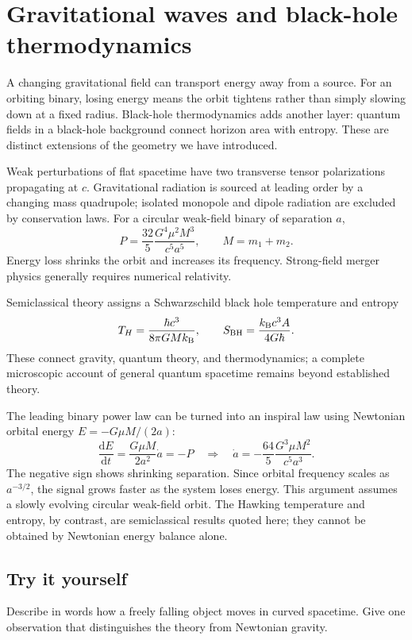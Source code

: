 \documentclass[11pt,oneside]{book}
\newcommand{\dd}{\mathrm{d}}
\newcommand{\od}[2]{\frac{\dd #1}{\dd #2}}
\newcommand{\kb}{k_{\mathrm B}}
\theoremstyle{reviewstyle}
\newcommand{\learningcheck}[1]{\subsection*{Try it yourself}\noindent #1\par}
\begin{document}
\section{Gravitational waves and black-hole thermodynamics}
A changing gravitational field can transport energy away from a source. For an orbiting binary, losing energy means the orbit tightens rather than simply slowing down at a fixed radius. Black-hole thermodynamics adds another layer: quantum fields in a black-hole background connect horizon area with entropy. These are distinct extensions of the geometry we have introduced.

Weak perturbations of flat spacetime have two transverse tensor polarizations propagating at $c$. Gravitational radiation is sourced at leading order by a changing mass quadrupole; isolated monopole and dipole radiation are excluded by conservation laws. For a circular weak-field binary of separation $a$,
\begin{equation}P=\frac{32}{5}\frac{G^4\mu^2M^3}{c^5a^5},\qquad M=m_1+m_2.\end{equation}
Energy loss shrinks the orbit and increases its frequency. Strong-field merger physics generally requires numerical relativity.

Semiclassical theory assigns a Schwarzschild black hole temperature and entropy
\begin{equation}T_H=\frac{\hbar c^3}{8\pi G M\kb},\qquad S_{\rm BH}=\frac{\kb c^3A}{4G\hbar}.\end{equation}
These connect gravity, quantum theory, and thermodynamics; a complete microscopic account of general quantum spacetime remains beyond established theory.

The leading binary power law can be turned into an inspiral law using Newtonian orbital energy $E=-G\mu M/(2a)$:
\begin{equation}
\od Et=\frac{G\mu M}{2a^2}\dot a=-P
\quad\Longrightarrow\quad
\dot a=-\frac{64}{5}\frac{G^3\mu M^2}{c^5a^3}.
\end{equation}
The negative sign shows shrinking separation. Since orbital frequency scales as $a^{-3/2}$, the signal grows faster as the system loses energy. This argument assumes a slowly evolving circular weak-field orbit. The Hawking temperature and entropy, by contrast, are semiclassical results quoted here; they cannot be obtained by Newtonian energy balance alone.

\learningcheck{Describe in words how a freely falling object moves in curved spacetime. Give one observation that distinguishes the theory from Newtonian gravity.}
\end{document}
